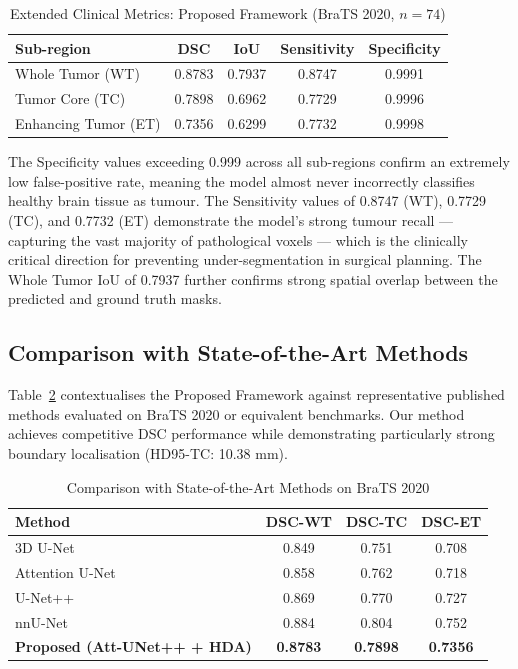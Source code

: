 \documentclass[conference]{IEEEtran}
\begin{document}
\begin{table}[h]
\centering
\caption{Extended Clinical Metrics: Proposed Framework (BraTS 2020, $n=74$)}
\label{tab:extended}
\begin{tabular}{@{}lcccc@{}}
\toprule
\textbf{Sub-region} & \textbf{DSC} & \textbf{IoU} & \textbf{Sensitivity} & \textbf{Specificity} \\ \midrule
Whole Tumor (WT)   & 0.8783 & 0.7937 & 0.8747 & 0.9991 \\
Tumor Core (TC)    & 0.7898 & 0.6962 & 0.7729 & 0.9996 \\
Enhancing Tumor (ET) & 0.7356 & 0.6299 & 0.7732 & 0.9998 \\ \bottomrule
\end{tabular}
\end{table}


The Specificity values exceeding 0.999 across all sub-regions confirm an extremely low false-positive rate, meaning the model almost never incorrectly classifies healthy brain tissue as tumour. The Sensitivity values of 0.8747 (WT), 0.7729 (TC), and 0.7732 (ET) demonstrate the model's strong tumour recall — capturing the vast majority of pathological voxels — which is the clinically critical direction for preventing under-segmentation in surgical planning. The Whole Tumor IoU of 0.7937 further confirms strong spatial overlap between the predicted and ground truth masks.

\subsection{Comparison with State-of-the-Art Methods}
Table~\ref{tab:sota} contextualises the Proposed Framework against representative published methods evaluated on BraTS 2020 or equivalent benchmarks. Our method achieves competitive DSC performance while demonstrating particularly strong boundary localisation (HD95-TC: 10.38 mm).

\begin{table}[h]
\centering
\caption{Comparison with State-of-the-Art Methods on BraTS 2020}
\label{tab:sota}
\begin{tabular}{@{}lccc@{}}
\toprule
\textbf{Method} & \textbf{DSC-WT} & \textbf{DSC-TC} & \textbf{DSC-ET} \\ \midrule
3D U-Net \cite{ronneberger2015u}          & 0.849  & 0.751  & 0.708 \\
Attention U-Net \cite{oktay2018attention} & 0.858  & 0.762  & 0.718 \\
U-Net++ \cite{zhou2018unet++}             & 0.869  & 0.770  & 0.727 \\
nnU-Net \cite{isensee2021nnu}             & 0.884  & 0.804  & 0.752 \\
\textbf{Proposed (Att-UNet++ + HDA)}      & \textbf{0.8783} & \textbf{0.7898} & \textbf{0.7356} \\ \bottomrule
\end{tabular}
\end{table}
\end{document}
